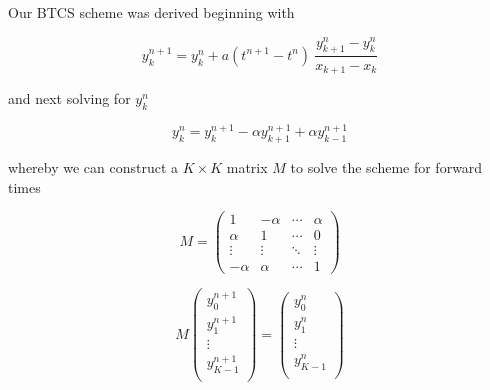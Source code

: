 \documentclass{article}
\begin{document}
\begin{homeworkProblem}

    Our BTCS scheme was derived beginning with

    \begin{equation}
        y^{n+1}_k = y^n_k + a(t^{n+1} - t^n)  \
        \frac{y^n_{k+1} - y^n_k}{x_{k+1} - x_k}
    \end{equation}

    \noindent and next solving for $y^n_k$

    \begin{equation}
        y^{n}_k = y^{n+1}_k - \alpha y^{n+1}_{k+1} + \alpha y^{n+1}_{k-1} 
    \end{equation}

    \noindent whereby we can construct a $K \times K$ matrix $M$ to solve the
    scheme for forward times

    \begin{equation}
        M =
         \begin{pmatrix}
          1 & -\alpha & \cdots & \alpha \\
          \alpha & 1 & \cdots & 0 \\
          \vdots  & \vdots  & \ddots & \vdots  \\
          -\alpha & \alpha & \cdots & 1
         \end{pmatrix}
    \end{equation}

    \begin{equation}
        M 
        \begin{pmatrix}
            y^{n+1}_{0} \\
            y^{n+1}_{1} \\
            \vdots \\
            y^{n+1}_{K-1} \\
        \end{pmatrix}
        =
        \begin{pmatrix}
            y^{n}_{0} \\
            y^{n}_{1} \\
            \vdots \\
            y^{n}_{K-1} \\
        \end{pmatrix}
    \end{equation}


\end{homeworkProblem}
\end{document}
